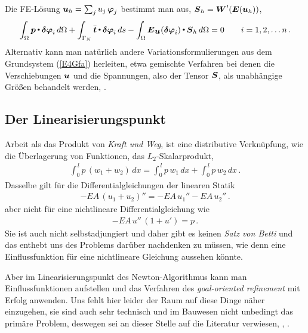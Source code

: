 Die FE-L\"{o}sung $\mbox{\boldmath $u$}_h = \sum_j u_j\,\mbox{\boldmath $\varphi$}_j$ bestimmt man aus, $\mbox{\boldmath $S$}_h = \mbox{\boldmath $W$}'(\mbox{\boldmath $E$}(\mbox{\boldmath $u$}_h))$,
\begin{align}
\int_{\Omega} \mbox{\boldmath $p$} {\,\scriptscriptstyle \stackrel{\bullet}{{}}}\, \mbox{\boldmath $\delta$} \mbox{\boldmath $\varphi$}_i\,d\Omega +
\int_{\Gamma_N}  \bar{\mbox{\boldmath $t$}} {\,\scriptscriptstyle \stackrel{\bullet}{{}}}\, \mbox{\boldmath $\delta$} \mbox{\boldmath $\varphi$}_i\,ds - \int_{\Omega} \mbox{\boldmath $E$}_{\mbox{\boldmath $u$}}(\mbox{\boldmath $\delta$} \mbox{\boldmath $\varphi$}_i) {\,\scriptscriptstyle \stackrel{\bullet}{{}}}\, \mbox{\boldmath $S$}_h\,d\Omega = 0 \qquad i = 1,2,\ldots n\,.
\end{align}
Alternativ kann man nat\"{u}rlich andere Variationsformulierungen aus dem Grundsystem (\ref{E4Gfa}) herleiten, etwa gemischte Verfahren bei denen die Verschiebungen $\mbox{\boldmath $u$}$ und die Spannungen, also der Tensor $\mbox{\boldmath $S$}$, als unabh\"{a}ngige Gr\"{o}{\ss}en behandelt werden, \cite{Ha1}.

{\textcolor{sectionTitleBlue}{\section{Der Linearisierungspunkt}}}
Arbeit als das Produkt von {\em Kraft und Weg\/}, ist eine distributive Verkn\"{u}pfung, wie die \"{U}berlagerung von Funktionen, das $L_2$-Skalar\-pro\-dukt,
\begin{align}
\int_0^{\,l} p\,(w_1 + w_2)\,dx = \int_0^{\,l} p\,w_1\,dx + \int_0^{\,l} p\,w_2\,dx \,.
\end{align}
Dasselbe gilt f\"{u}r die Differentialgleichungen der linearen Statik
\begin{align}
-EA\,(u_1 + u_2)'' = -EA\,u_1'' - EA\,u_2''\,.
\end{align}
aber nicht f\"{u}r eine nichtlineare Differentialgleichung wie
\begin{align}
-EA\,u''\,(1 + u') = p\,.
\end{align}
Sie ist auch nicht selbstadjungiert und daher gibt es keinen {\em Satz von Betti\/} und das enthebt uns des Problems dar\"{u}ber nachdenken zu m\"{u}ssen, wie denn eine Einflussfunktion f\"{u}r eine nichtlineare Gleichung aussehen k\"{o}nnte.

Aber im Linearisierungspunkt des Newton-Algorithmus kann man Einflussfunktionen aufstellen und das Verfahren des {\em goal-oriented refinement\/} mit Erfolg anwenden. Uns fehlt hier leider der Raum auf diese Dinge n\"{a}her einzugehen, sie sind auch sehr technisch und im Bauwesen nicht unbedingt das prim\"{a}re Problem, deswegen sei an dieser Stelle auf die Literatur verwiesen, \cite{Ha1}, \cite{Ha6}.


